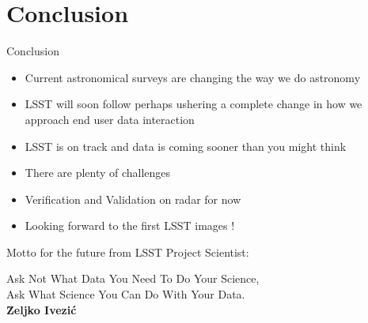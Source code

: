 \section {Conclusion}
\begin{frame}{Conclusion}

\begin{itemize}
\item Current astronomical surveys are changing the way we do astronomy
\item LSST will soon follow perhaps ushering a complete change in how we approach end
user data interaction
\item LSST is on track and data is coming sooner than you might think
\item There are plenty of challenges
\item Verification and Validation on radar for now
\item Looking forward to the first LSST images !


\end{itemize}

\vspace {10pt}
Motto for the future from LSST Project Scientist:
\begin {center}
{\color{blue}   Ask Not What Data You Need To Do Your Science,\\ Ask What Science You Can Do With Your Data. }\\
\hfill {\tiny \bf \u{Z}eljko Ivezi\'c}
\end {center}
\end{frame}




